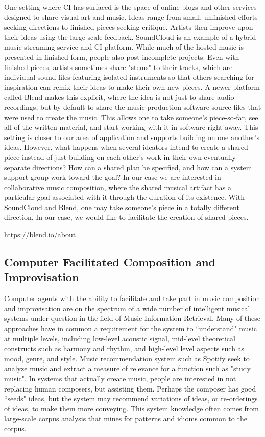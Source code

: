 \documentclass[final,authoryear,11pt,times]{elsarticle}
\begin{document}
One setting where CI has surfaced is the space of online blogs and other services designed to share visual art and music. Ideas range from small, unfinished efforts seeking directions to finished pieces seeking critique. Artists then improve upon their ideas using the large-scale feedback. SoundCloud is an example of a hybrid music streaming service and CI platform. While much of the hosted music is presented in finished form, people also post incomplete projects. Even with finished pieces, artists sometimes share "stems" to their tracks, which are individual sound files featuring isolated instruments so that others searching for inspiration can remix their ideas to make their own new pieces. A newer platform called Blend makes this explicit, where the idea is not just to share audio recordings, but by default to share the music production software source files that were used to create the music. This allows one to take someone's piece-so-far, see all of the written material, and start working with it in software right away. This setting is closer to our area of application and supports building on one another's ideas. However, what happens when several ideators intend to create a shared piece instead of just building on each other's work in their own eventually separate directions? How can a shared plan be specified, and how can a system support group work toward the goal? In our case we are interested in collaborative music composition, where the shared musical artifact has a particular goal associated with it through the duration of its existence. With SoundCloud and Blend, one may take someone's piece in a totally different direction. In our case, we would like to facilitate the creation of shared pieces.

https://blend.io/about 

\subsection{Computer Facilitated Composition and Improvisation}

Computer agents with the ability to facilitate and take part in music composition and improvisation are on the spectrum of a wide number of intelligent musical systems under question in the field of Music Information Retrieval. Many of these approaches have in common a requirement for the system to ``understand" music at multiple levels, including low-level acoustic signal, mid-level theoretical constructs such as harmony and rhythm, and high-level level aspects such as mood, genre, and style. Music recommendation system such as Spotify seek to analyze music and extract a measure of relevance for a function such as "study music". In systems that actually create music, people are interested in not replacing human composers, but assisting them. Perhaps the composer has good ``seeds" ideas, but the system may recommend variations of ideas, or re-orderings of ideas, to make them more conveying. This system knowledge often comes from large-scale corpus analysis that mines for patterns and idioms common to the corpus.
\end{document}
